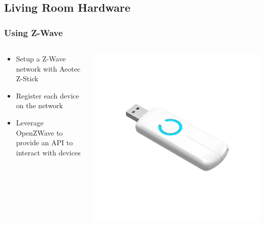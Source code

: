 \documentclass[aspectratio=169,11pt,hyperref={colorlinks=true}]{beamer}
\begin{document}
\subsection{Living Room Hardware}
\begin{frame}
    \frametitle{Using Z-Wave}
    \begin{columns}[T]
        \begin{column}{.48\textwidth}
            \begin{itemize}
                \item Setup a Z-Wave network with Aeotec Z-Stick
                \item Register each device on the network
                \item Leverage OpenZWave to provide an API to interact with
                    devices
            \end{itemize}
        \end{column}
        \begin{column}{.48\textwidth}
            \centering
            \includegraphics[width=.8\textwidth]{aeotec-zstick.jpg}
        \end{column}
    \end{columns}
\end{frame}
\end{document}
